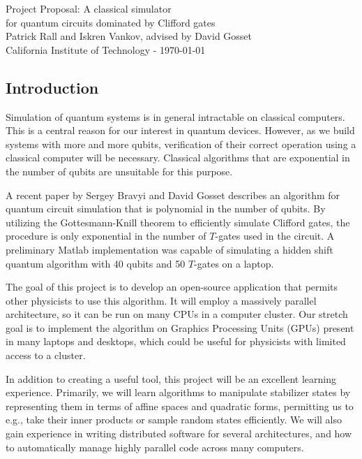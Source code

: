 \documentclass[11pt]{article}
\begin{document}
\begin{center}
    {\LARGE Project Proposal: A classical simulator\\ for quantum circuits dominated by Clifford gates }
\vspace{2mm}
{\large \\ Patrick Rall and Iskren Vankov, advised by David Gosset \\ California Institute of Technology -  \today}
\end{center}

\newenvironment{Figure}
  {\par\medskip\noindent\minipage{\linewidth}}
  {\endminipage\par\medskip}



\subsection*{Introduction}
Simulation of quantum systems is in general intractable on classical computers. This is a central reason for our interest in quantum devices. However, as we build systems with more and more qubits, verification of their correct operation using a classical computer will be necessary. Classical algorithms that are exponential in the number of qubits are unsuitable for this purpose.

A recent paper by Sergey Bravyi and David Gosset \cite{bravyi-gosset} describes an algorithm for quantum circuit simulation that is polynomial in the number of qubits. By utilizing the Gottesmann-Knill theorem to efficiently simulate Clifford gates, the procedure is only exponential in the number of $T$-gates used in the circuit. A preliminary Matlab implementation was capable of simulating a hidden shift quantum algorithm with 40 qubits and 50 $T$-gates on a laptop.

The goal of this project is to develop an open-source application that permits other physicists to use this algorithm. It will employ a massively parallel architecture, so it can be run on many CPUs in a computer cluster. Our stretch goal is to implement the algorithm on Graphics Processing Units (GPUs) present in many laptops and desktops, which could be useful for physicists with limited access to a cluster. 

In addition to creating a useful tool, this project will be an excellent learning experience.  Primarily, we will learn algorithms to manipulate stabilizer states by representing them in terms of affine spaces and quadratic forms, permitting us to e.g., take their inner products or sample random states efficiently. We will also gain experience in writing distributed software for several architectures, and how to automatically manage highly parallel code across many computers. 
\end{document}
